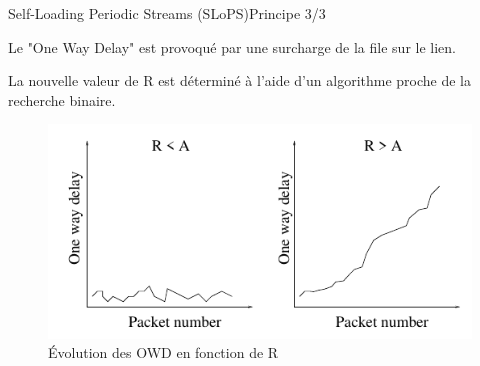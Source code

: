 \documentclass[compress]{beamer}
\begin{document}
\begin{frame}{Self-Loading Periodic Streams (SLoPS)}{Principe 3/3}

Le "One Way Delay" est provoqué par une surcharge de la file
sur le lien.

La nouvelle valeur de R est déterminé à l'aide d'un algorithme
proche de la recherche binaire.

\begin{figure}[hbtp]
		\centering
		\includegraphics[scale=0.4]{slopsOWD.png}
		\caption{Évolution des OWD en fonction de R}
\end{figure}

\end{frame}
\end{document}
